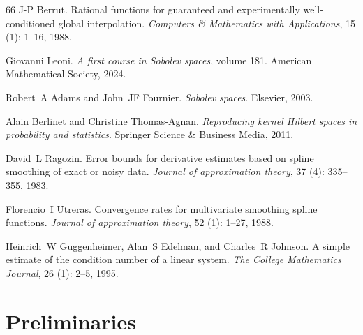 \documentclass{article}
\begin{document}
\begin{thebibliography}{66}
J-P Berrut.
\newblock Rational functions for guaranteed and experimentally well-conditioned global interpolation.
\newblock \emph{Computers \& Mathematics with Applications}, 15 (1): 1--16, 1988.

Giovanni Leoni.
\newblock \emph{A first course in Sobolev spaces}, volume 181.
\newblock American Mathematical Society, 2024.

Robert~A Adams and John~JF Fournier.
\newblock \emph{Sobolev spaces}.
\newblock Elsevier, 2003.

Alain Berlinet and Christine Thomas-Agnan.
\newblock \emph{Reproducing kernel Hilbert spaces in probability and statistics}.
\newblock Springer Science \& Business Media, 2011.

David~L Ragozin.
\newblock Error bounds for derivative estimates based on spline smoothing of exact or noisy data.
\newblock \emph{Journal of approximation theory}, 37 (4): 335--355, 1983.

Florencio~I Utreras.
\newblock Convergence rates for multivariate smoothing spline functions.
\newblock \emph{Journal of approximation theory}, 52 (1): 1--27, 1988.

Heinrich~W Guggenheimer, Alan~S Edelman, and Charles~R Johnson.
\newblock A simple estimate of the condition number of a linear system.
\newblock \emph{The College Mathematics Journal}, 26 (1): 2--5, 1995.

\end{thebibliography}


\newpage
\appendix
\section{Preliminaries}
\end{document}
